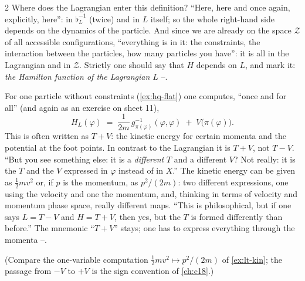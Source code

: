 \begin{paracol}{2}
Where does the Lagrangian enter this definition? ``Here, here and once again, explicitly, here'': in $\flat_L^{-1}$ (twice) and in $L$ itself; so the whole right-hand side depends on the dynamics of the particle. And since we are already on the space $\mathcal Z$ of all accessible configurations, ``everything is in it: the constraints, the interaction between the particles, how many particles you have'': it is all in the Lagrangian and in $\mathcal Z$. Strictly one should say that $H$ depends on $L$, and mark it: \emph{the Hamilton function of the Lagrangian $L$} --.

\begin{example}\label{ex:hq-ham}
For one particle without constraints (\cref{ex:hq-flat}) one computes, ``once and for all'' (and again as an exercise on sheet 11),
\[
  H_L(\varphi)\;=\;\frac1{2m}\,g^{-1}_{\pi(\varphi)}(\varphi,\varphi)\;+\;V\bigl(\pi(\varphi)\bigr).
\]
This is often written as $T+V$: the kinetic energy for certain momenta and the potential at the foot points. In contrast to the Lagrangian it is $T+V$, not $T-V$. ``But you see something else: it is a \emph{different} $T$ and a different $V$? Not really: it is the $T$ and the $V$ expressed in $\varphi$ instead of in $X$.'' The kinetic energy can be given as $\tfrac12mv^2$ or, if $p$ is the momentum, as $p^2/(2m)$: two different expressions, one using the velocity and one the momentum, and, thinking in terms of velocity and momentum phase space, really different maps. ``This is philosophical, but if one says $L=T-V$ and $H=T+V$, then yes, but the $T$ is formed differently than before.'' The mnemonic ``$T+V$'' stays; one has to express everything through the momenta --.
\end{example}
(Compare the one-variable computation $\tfrac12mv^2\mapsto p^2/(2m)$ of \cref{ex:lt-kin}; the passage from $-V$ to $+V$ is the sign convention of \cref{ch:c18}.)


\end{paracol}
